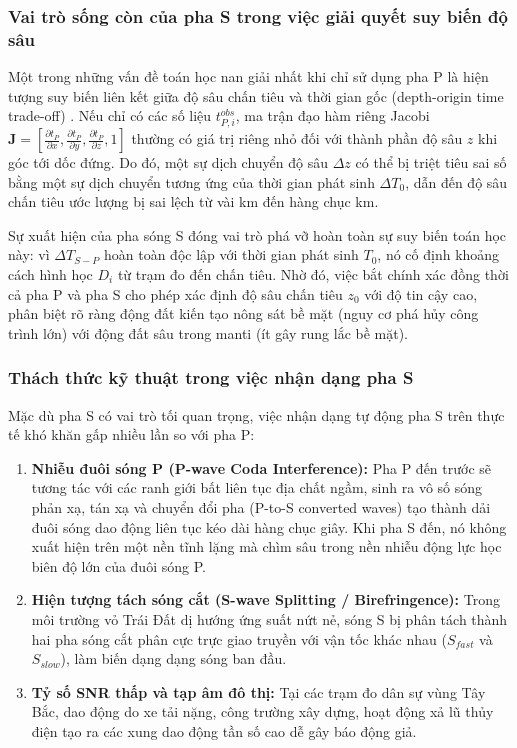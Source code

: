 \documentclass[preprint,1p]{elsarticle}
\begin{document}
\subsubsection{Vai trò sống còn của pha S trong việc giải quyết suy biến độ sâu}
Một trong những vấn đề toán học nan giải nhất khi chỉ sử dụng pha P là hiện tượng suy biến liên kết giữa độ sâu chấn tiêu và thời gian gốc (depth-origin time trade-off) \cite{zhu2019phasenet,zhang2022locflow}. Nếu chỉ có các số liệu $t_{P,i}^{obs}$, ma trận đạo hàm riêng Jacobi $\mathbf{J} = \left[\frac{\partial t_P}{\partial x}, \frac{\partial t_P}{\partial y}, \frac{\partial t_P}{\partial z}, 1\right]$ thường có giá trị riêng nhỏ đối với thành phần độ sâu $z$ khi góc tới dốc đứng. Do đó, một sự dịch chuyển độ sâu $\Delta z$ có thể bị triệt tiêu sai số bằng một sự dịch chuyển tương ứng của thời gian phát sinh $\Delta T_0$, dẫn đến độ sâu chấn tiêu ước lượng bị sai lệch từ vài km đến hàng chục km.

Sự xuất hiện của pha sóng S đóng vai trò phá vỡ hoàn toàn sự suy biến toán học này: vì $\Delta T_{S-P}$ hoàn toàn độc lập với thời gian phát sinh $T_0$, nó cố định khoảng cách hình học $D_i$ từ trạm đo đến chấn tiêu. Nhờ đó, việc bắt chính xác đồng thời cả pha P và pha S cho phép xác định độ sâu chấn tiêu $z_0$ với độ tin cậy cao, phân biệt rõ ràng động đất kiến tạo nông sát bề mặt (nguy cơ phá hủy công trình lớn) với động đất sâu trong manti (ít gây rung lắc bề mặt).

\subsubsection{Thách thức kỹ thuật trong việc nhận dạng pha S}
Mặc dù pha S có vai trò tối quan trọng, việc nhận dạng tự động pha S trên thực tế khó khăn gấp nhiều lần so với pha P:
\begin{enumerate}
    \item \textbf{Nhiễu đuôi sóng P (P-wave Coda Interference):} Pha P đến trước sẽ tương tác với các ranh giới bất liên tục địa chất ngầm, sinh ra vô số sóng phản xạ, tán xạ và chuyển đổi pha (P-to-S converted waves) tạo thành dải đuôi sóng dao động liên tục kéo dài hàng chục giây. Khi pha S đến, nó không xuất hiện trên một nền tĩnh lặng mà chìm sâu trong nền nhiễu động lực học biên độ lớn của đuôi sóng P.
    \item \textbf{Hiện tượng tách sóng cắt (S-wave Splitting / Birefringence):} Trong môi trường vỏ Trái Đất dị hướng ứng suất nứt nẻ, sóng S bị phân tách thành hai pha sóng cắt phân cực trực giao truyền với vận tốc khác nhau ($S_{fast}$ và $S_{slow}$), làm biến dạng dạng sóng ban đầu.
    \item \textbf{Tỷ số SNR thấp và tạp âm đô thị:} Tại các trạm đo dân sự vùng Tây Bắc, dao động do xe tải nặng, công trường xây dựng, hoạt động xả lũ thủy điện tạo ra các xung dao động tần số cao dễ gây báo động giả.
\end{enumerate}
\end{document}
